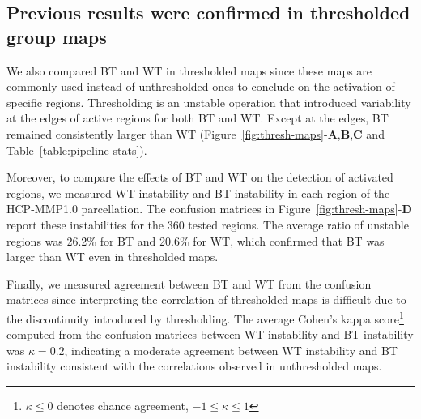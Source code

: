 \documentclass[11pt,onecolumn]{article}
\begin{document}

\subsection{Previous results were confirmed in thresholded group maps}

We also compared BT and WT in thresholded maps since these maps are commonly used instead of unthresholded ones 
to conclude on the activation of specific regions. Thresholding is an unstable operation
that introduced variability at the edges of
active regions for both BT and WT. Except at the edges, BT remained consistently larger
than WT (Figure~\ref{fig:thresh-maps}-\textbf{A},\textbf{B},\textbf{C} and Table~\ref{table:pipeline-stats}). 

Moreover, to compare the effects of BT and WT on the detection of activated
regions, we measured WT instability and BT instability in each region of
the HCP-MMP1.0 parcellation. The confusion matrices in
Figure~\ref{fig:thresh-maps}-\textbf{D} report these instabilities for the
360 tested regions. The average ratio of unstable regions was 26.2\% for BT
and 20.6\% for WT, which confirmed that BT was larger than
WT even in thresholded maps.

Finally, we measured agreement between BT and WT from the confusion
matrices since interpreting the correlation of thresholded maps is
difficult due to the discontinuity introduced by thresholding. 
The average Cohen's kappa score\footnote{$\kappa \leq 0$ denotes chance agreement, $-1 \leq \kappa \leq 1$}
computed from the confusion matrices between WT instability and BT instability was $\kappa=0.2$, indicating
a moderate agreement between WT instability and BT instability consistent with the correlations observed in 
unthresholded maps.
\end{document}
